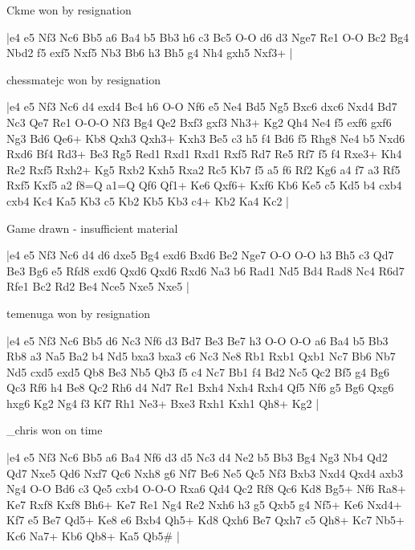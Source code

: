 \showboard

Ckme won by resignation

\makegametitle
|e4 e5 Nf3 Nc6 Bb5 a6 Ba4 b5 Bb3 h6 c3 Bc5 O-O d6 d3 Nge7 Re1 O-O Bc2 Bg4 Nbd2 f5 exf5 Nxf5 Nb3 Bb6 h3 Bh5 g4 Nh4 gxh5 Nxf3+  |

\showboard

chessmatejc won by resignation

\makegametitle
|e4 e5 Nf3 Nc6 d4 exd4 Bc4 h6 O-O Nf6 e5 Ne4 Bd5 Ng5 Bxc6 dxc6 Nxd4 Bd7 Nc3 Qe7 Re1 O-O-O Nf3 Bg4 Qe2 Bxf3 gxf3 Nh3+ Kg2 Qh4 Ne4 f5 exf6 gxf6 Ng3 Bd6 Qe6+ Kb8 Qxh3 Qxh3+ Kxh3 Be5 c3 h5 f4 Bd6 f5 Rhg8 Ne4 b5 Nxd6 Rxd6 Bf4 Rd3+ Be3 Rg5 Red1 Rxd1 Rxd1 Rxf5 Rd7 Re5 Rf7 f5 f4 Rxe3+ Kh4 Re2 Rxf5 Rxh2+ Kg5 Rxb2 Kxh5 Rxa2 Rc5 Kb7 f5 a5 f6 Rf2 Kg6 a4 f7 a3 Rf5 Rxf5 Kxf5 a2 f8=Q a1=Q Qf6 Qf1+ Ke6 Qxf6+ Kxf6 Kb6 Ke5 c5 Kd5 b4 cxb4 cxb4 Kc4 Ka5 Kb3 c5 Kb2 Kb5 Kb3 c4+ Kb2 Ka4 Kc2  |

\showboard

Game drawn - insufficient material

\makegametitle
|e4 e5 Nf3 Nc6 d4 d6 dxe5 Bg4 exd6 Bxd6 Be2 Nge7 O-O O-O h3 Bh5 c3 Qd7 Be3 Bg6 e5 Rfd8 exd6 Qxd6 Qxd6 Rxd6 Na3 b6 Rad1 Nd5 Bd4 Rad8 Nc4 R6d7 Rfe1 Bc2 Rd2 Be4 Nce5 Nxe5 Nxe5  |

\showboard

temenuga won by resignation

\makegametitle
|e4 e5 Nf3 Nc6 Bb5 d6 Nc3 Nf6 d3 Bd7 Be3 Be7 h3 O-O O-O a6 Ba4 b5 Bb3 Rb8 a3 Na5 Ba2 b4 Nd5 bxa3 bxa3 c6 Nc3 Ne8 Rb1 Rxb1 Qxb1 Nc7 Bb6 Nb7 Nd5 cxd5 exd5 Qb8 Be3 Nb5 Qb3 f5 c4 Nc7 Bb1 f4 Bd2 Nc5 Qc2 Bf5 g4 Bg6 Qc3 Rf6 h4 Be8 Qc2 Rh6 d4 Nd7 Re1 Bxh4 Nxh4 Rxh4 Qf5 Nf6 g5 Bg6 Qxg6 hxg6 Kg2 Ng4 f3 Kf7 Rh1 Ne3+ Bxe3 Rxh1 Kxh1 Qh8+ Kg2  |

\showboard

\_chris won on time

\makegametitle
|e4 e5 Nf3 Nc6 Bb5 a6 Ba4 Nf6 d3 d5 Nc3 d4 Ne2 b5 Bb3 Bg4 Ng3 Nb4 Qd2 Qd7 Nxe5 Qd6 Nxf7 Qc6 Nxh8 g6 Nf7 Be6 Ne5 Qc5 Nf3 Bxb3 Nxd4 Qxd4 axb3 Ng4 O-O Bd6 c3 Qe5 cxb4 O-O-O Rxa6 Qd4 Qc2 Rf8 Qc6 Kd8 Bg5+ Nf6 Ra8+ Ke7 Rxf8 Kxf8 Bh6+ Ke7 Re1 Ng4 Re2 Nxh6 h3 g5 Qxb5 g4 Nf5+ Ke6 Nxd4+ Kf7 e5 Be7 Qd5+ Ke8 e6 Bxb4 Qh5+ Kd8 Qxh6 Be7 Qxh7 c5 Qh8+ Kc7 Nb5+ Kc6 Na7+ Kb6 Qb8+ Ka5 Qb5\#  |


